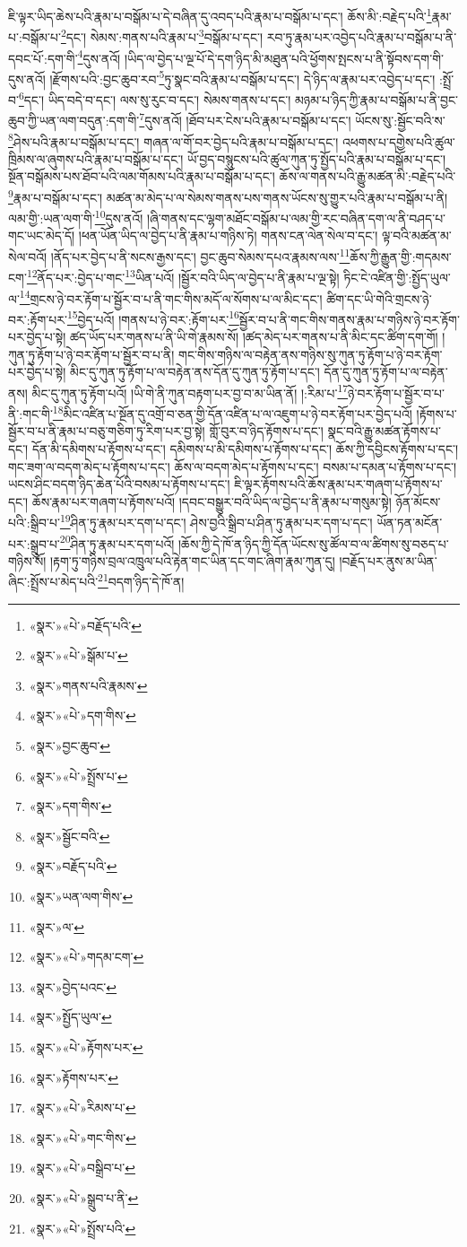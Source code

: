 ཇི་ལྟར་ཡིད་ཆེས་པའི་རྣམ་པ་བསྒོམ་པ་དེ་བཞིན་དུ་འབད་པའི་རྣམ་པ་བསྒོམ་པ་དང་། ཆོས་མི་:བརྗེད་པའི་\footnote{«སྣར་»«པེ་»བརྗོད་པའི་}རྣམ་པ་:བསྒོམ་པ་\footnote{«སྣར་»«པེ་»སྒོམ་པ་}དང་། སེམས་:གནས་པའི་རྣམ་པ་\footnote{«སྣར་»གནས་པའི་རྣམས་}བསྒོམ་པ་དང་། རབ་ཏུ་རྣམ་པར་འབྱེད་པའི་རྣམ་པ་བསྒོམ་པ་ནི་དབང་པོ་:དག་གི་\footnote{«སྣར་»«པེ་»དག་གིས་}དུས་ནའོ། །ཡིད་ལ་བྱེད་པ་ལྔ་པོ་དེ་དག་ཉིད་མི་མཐུན་པའི་ཕྱོགས་སྤངས་པ་ནི་སྟོབས་དག་གི་དུས་ནའོ། །རྫོགས་པའི་:བྱང་ཆུབ་རབ་\footnote{«སྣར་»བྱང་ཆུབ་}ཏུ་སྣང་བའི་རྣམ་པ་བསྒོམ་པ་དང་། དེ་ཉིད་ལ་རྣམ་པར་འབྱེད་པ་དང་། :སྤྲོ་བ་\footnote{«སྣར་»«པེ་»སྤྲོས་པ་}དང་། ཡིད་བདེ་བ་དང་། ལས་སུ་རུང་བ་དང་། སེམས་གནས་པ་དང་། མཉམ་པ་ཉིད་ཀྱི་རྣམ་པ་བསྒོམ་པ་ནི་བྱང་ཆུབ་ཀྱི་ཡན་ལག་བདུན་:དག་གི་\footnote{«སྣར་»དག་གིས་}དུས་ནའོ། །ཐོབ་པར་ངེས་པའི་རྣམ་པ་བསྒོམ་པ་དང་། ཡོངས་སུ་:སྦྱོང་བའི་ས་\footnote{«སྣར་»སྦྱོང་བའི་}ཤེས་པའི་རྣམ་པ་བསྒོམ་པ་དང་། གཞན་ལ་གོ་བར་བྱེད་པའི་རྣམ་པ་བསྒོམ་པ་དང་། འཕགས་པ་དགྱེས་པའི་ཚུལ་ཁྲིམས་ལ་ཞུགས་པའི་རྣམ་པ་བསྒོམ་པ་དང་། ཡོ་བྱད་བསྙུངས་པའི་ཚུལ་ཀུན་ཏུ་སྤྱོད་པའི་རྣམ་པ་བསྒོམ་པ་དང་། སྔོན་བསྒོམས་པས་ཐོབ་པའི་ལམ་གོམས་པའི་རྣམ་པ་བསྒོམ་པ་དང་། ཆོས་ལ་གནས་པའི་རྒྱུ་མཚན་མི་:བརྗེད་པའི་\footnote{«སྣར་»བརྗོད་པའི་}རྣམ་པ་བསྒོམ་པ་དང་། མཚན་མ་མེད་པ་ལ་སེམས་གནས་པས་གནས་ཡོངས་སུ་གྱུར་པའི་རྣམ་པ་བསྒོམ་པ་ནི། ལམ་གྱི་:ཡན་ལག་གི་\footnote{«སྣར་»ཡན་ལག་གིས་}དུས་ནའོ། །ཞི་གནས་དང་ལྷག་མཐོང་བསྒོམ་པ་ལམ་གྱི་རང་བཞིན་དག་ལ་ནི་བཤད་པ་གང་ཡང་མེད་དོ། །ཕན་ཡོན་ཡིད་ལ་བྱེད་པ་ནི་རྣམ་པ་གཉིས་ཏེ། གནས་ངན་ལེན་སེལ་བ་དང་། ལྟ་བའི་མཚན་མ་སེལ་བའོ། །ནོད་པར་བྱེད་པ་ནི་སངས་རྒྱས་དང་། བྱང་ཆུབ་སེམས་དཔའ་རྣམས་ལས་\footnote{«སྣར་»ལ་}ཆོས་ཀྱི་རྒྱུན་གྱི་:གདམས་ངག་\footnote{«སྣར་»«པེ་»གདམ་ངག་}ནོད་པར་:བྱེད་པ་གང་\footnote{«སྣར་»བྱེད་པའང་}ཡིན་པའོ། །སྦྱོར་བའི་ཡིད་ལ་བྱེད་པ་ནི་རྣམ་པ་ལྔ་སྟེ། ཏིང་ངེ་འཛིན་གྱི་:སྤྱོད་ཡུལ་ལ་\footnote{«སྣར་»སྤྱོད་ཡུལ་}གྲངས་ཉེ་བར་རྟོག་པ་སྦྱོར་བ་པ་ནི་གང་གིས་མདོ་ལ་སོགས་པ་ལ་མིང་དང་། ཚིག་དང་ཡི་གེའི་གྲངས་ཉེ་བར་:རྟོག་པར་\footnote{«སྣར་»«པེ་»རྟོགས་པར་}བྱེད་པའོ། །གནས་པ་ཉེ་བར་:རྟོག་པར་\footnote{«སྣར་»རྟོགས་པར་}སྦྱོར་བ་པ་ནི་གང་གིས་གནས་རྣམ་པ་གཉིས་ཉེ་བར་རྟོག་པར་བྱེད་པ་སྟེ། ཚད་ཡོད་པར་གནས་པ་ནི་ཡི་གེ་རྣམས་སོ། །ཚད་མེད་པར་གནས་པ་ནི་མིང་དང་ཚིག་དག་གོ། །ཀུན་ཏུ་རྟོག་པ་ཉེ་བར་རྟོག་པ་སྦྱོར་བ་པ་ནི། གང་གིས་གཉིས་ལ་བརྟེན་ནས་གཉིས་སུ་ཀུན་ཏུ་རྟོག་པ་ཉེ་བར་རྟོག་པར་བྱེད་པ་སྟེ། མིང་དུ་ཀུན་ཏུ་རྟོག་པ་ལ་བརྟེན་ནས་དོན་དུ་ཀུན་ཏུ་རྟོག་པ་དང་། དོན་དུ་ཀུན་ཏུ་རྟོག་པ་ལ་བརྟེན་ནས། མིང་དུ་ཀུན་ཏུ་རྟོག་པའོ། །ཡི་གེ་ནི་ཀུན་བརྟག་པར་བྱ་བ་མ་ཡིན་ནོ། །:རིམ་པ་\footnote{«སྣར་»«པེ་»རིམས་པ་}ཉེ་བར་རྟོག་པ་སྦྱོར་བ་པ་ནི་:གང་གི་\footnote{«སྣར་»«པེ་»གང་གིས་}མིང་འཛིན་པ་སྔོན་དུ་འགྲོ་བ་ཅན་གྱི་དོན་འཛིན་པ་ལ་འཇུག་པ་ཉེ་བར་རྟོག་པར་བྱེད་པའོ། །རྟོགས་པ་སྦྱོར་བ་པ་ནི་རྣམ་པ་བཅུ་གཅིག་ཏུ་རིག་པར་བྱ་སྟེ། གློ་བུར་བ་ཉིད་རྟོགས་པ་དང་། སྣང་བའི་རྒྱུ་མཚན་རྟོགས་པ་དང་། དོན་མི་དམིགས་པ་རྟོགས་པ་དང་། དམིགས་པ་མི་དམིགས་པ་རྟོགས་པ་དང་། ཆོས་ཀྱི་དབྱིངས་རྟོགས་པ་དང་། གང་ཟག་ལ་བདག་མེད་པ་རྟོགས་པ་དང་། ཆོས་ལ་བདག་མེད་པ་རྟོགས་པ་དང་། བསམ་པ་དམན་པ་རྟོགས་པ་དང་། ཡངས་ཤིང་བདག་ཉིད་ཆེན་པོའི་བསམ་པ་རྟོགས་པ་དང་། ཇི་ལྟར་རྟོགས་པའི་ཆོས་རྣམ་པར་གཞག་པ་རྟོགས་པ་དང་། ཆོས་རྣམ་པར་གཞག་པ་རྟོགས་པའོ། །དབང་བསྒྱུར་བའི་ཡིད་ལ་བྱེད་པ་ནི་རྣམ་པ་གསུམ་སྟེ། ཉོན་མོངས་པའི་:སྒྲིབ་པ་\footnote{«སྣར་»«པེ་»བསྒྲིབ་པ་}ཤིན་ཏུ་རྣམ་པར་དག་པ་དང་། ཤེས་བྱའི་སྒྲིབ་པ་ཤིན་ཏུ་རྣམ་པར་དག་པ་དང་། ཡོན་ཏན་མངོན་པར་:སྒྲུབ་པ་\footnote{«སྣར་»«པེ་»སྒྲུབ་པ་ནི་}ཤིན་ཏུ་རྣམ་པར་དག་པའོ། །ཆོས་ཀྱི་དེ་ཁོ་ན་ཉིད་ཀྱི་དོན་ཡོངས་སུ་ཚོལ་བ་ལ་ཚིགས་སུ་བཅད་པ་གཉིས་སོ། །རྟག་ཏུ་གཉིས་བྲལ་འཁྲུལ་པའི་རྟེན་གང་ཡིན་དང་གང་ཞིག་རྣམ་ཀུན་དུ། །བརྗོད་པར་ནུས་མ་ཡིན་ཞིང་:སྤྲོས་པ་མེད་པའི་\footnote{«སྣར་»«པེ་»སྤྲོས་པའི་}བདག་ཉིད་དེ་ཁོ་ན། 